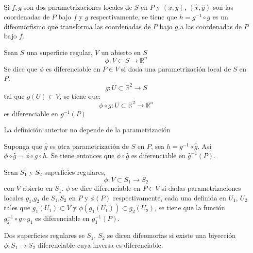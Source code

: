 \begin{remark}
  Si $f,g$ son dos parametrizaciones locales de $S$ en $P$ y $(x,y)$,
  $(\hat{x},\hat{y})$ son las coordenadas de $P$ bajo $f$ y $g$ respectivamente,
  se tiene que $h = g^{-1} \circ g$ es un difeomorfismo que transforma las
  coordenadas de $P$ bajo $g$ a las coordenadas de $P$ bajo $f$.
\end{remark}
\begin{definition}
 Sean $S$ una superficie regular, $V$ un abierto en $S$
 \[
   \phi: V \subset S \to \mathbb{R}^n
 \]
 Se dice que $\phi$ es diferenciable en $P \in V$ si dada una parametrización
 local de $S$ en $P$.
 \[
   g:U \subset \mathbb{R}^2 \to S
 \]
 tal que $g(U) \subset V$, se tiene que:
 \[
   \phi \circ g: U \subset \mathbb{R}^2 \to \mathbb{R}^n
 \]
 es diferenciable en $g^{-1}(P)$
\end{definition}
\begin{remark}
 La definición anterior no depende de la parametrización 

 Suponga que $\hat{g}$ es otra parametrización de $S$ en $P$, sea $h = g^{-1}
 \circ \hat{g}$. Así $\phi \circ \hat{g} = \phi \circ g \circ h$.
 Se tiene entonces que $\phi \circ \hat{g}$ es diferenciable en
 $\hat{g}^{-1}(P)$.

\end{remark}
\begin{definition}
 Sean $S_1$ y $S_2$ superficies regulares,
 \[
   \phi: V \subset S_1 \to S_2
 \]
 con $V$ abierto en $S_1$. $\phi$ se dice diferenciable en $P \in V$ si dadas
 parametrizaciones locales $g_1$,$g_2$ de $S_1$,$S_2$ en $P$ y $\phi(P)$
 respectivamente, cada una definida en $U_1$, $U_2$ tales que $g_1(U_1) \subset
 V$ y $\phi(g_1(U_1)) \subset g_2(U_2)$, se tiene que la función
 $g_2^{-1} \circ g \circ g_1$ es diferenciable en $g_1^{-1}(P)$. 

\end{definition}
\begin{definition}
 Dos superficies regulares se $S_1$, $S_2$ se dicen difeomorfas si existe una
 biyección $\phi:S_1 \to S_2$ diferenciable cuya inversa es diferenciable.

\end{definition}

